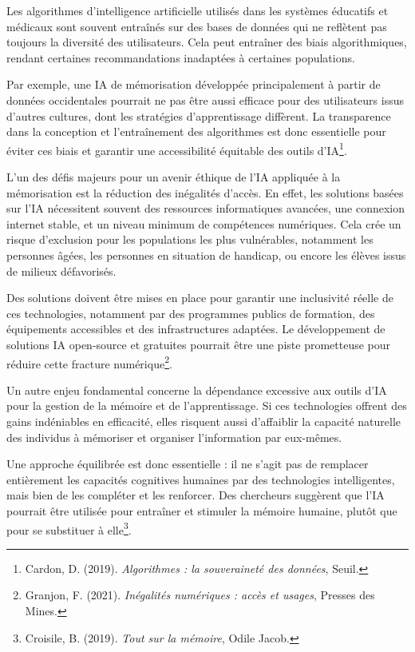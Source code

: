 \documentclass[12pt,a4paper]{report}
\begin{document}
Les algorithmes d’intelligence artificielle utilisés dans les systèmes éducatifs et médicaux sont souvent entraînés sur des bases de données qui ne reflètent pas toujours la diversité des utilisateurs. Cela peut entraîner des biais algorithmiques, rendant certaines recommandations inadaptées à certaines populations.

Par exemple, une IA de mémorisation développée principalement à partir de données occidentales pourrait ne pas être aussi efficace pour des utilisateurs issus d’autres cultures, dont les stratégies d’apprentissage diffèrent. La transparence dans la conception et l’entraînement des algorithmes est donc essentielle pour éviter ces biais et garantir une accessibilité équitable des outils d’IA\footnote{Cardon, D. (2019). \textit{Algorithmes : la souveraineté des données}, Seuil.}.

L’un des défis majeurs pour un avenir éthique de l’IA appliquée à la mémorisation est la réduction des inégalités d’accès. En effet, les solutions basées sur l’IA nécessitent souvent des ressources informatiques avancées, une connexion internet stable, et un niveau minimum de compétences numériques. Cela crée un risque d’exclusion pour les populations les plus vulnérables, notamment les personnes âgées, les personnes en situation de handicap, ou encore les élèves issus de milieux défavorisés.

Des solutions doivent être mises en place pour garantir une inclusivité réelle de ces technologies, notamment par des programmes publics de formation, des équipements accessibles et des infrastructures adaptées. Le développement de solutions IA open-source et gratuites pourrait être une piste prometteuse pour réduire cette fracture numérique\footnote{Granjon, F. (2021). \textit{Inégalités numériques : accès et usages}, Presses des Mines.}.

Un autre enjeu fondamental concerne la dépendance excessive aux outils d’IA pour la gestion de la mémoire et de l’apprentissage. Si ces technologies offrent des gains indéniables en efficacité, elles risquent aussi d’affaiblir la capacité naturelle des individus à mémoriser et organiser l’information par eux-mêmes.

Une approche équilibrée est donc essentielle : il ne s’agit pas de remplacer entièrement les capacités cognitives humaines par des technologies intelligentes, mais bien de les compléter et les renforcer. Des chercheurs suggèrent que l’IA pourrait être utilisée pour entraîner et stimuler la mémoire humaine, plutôt que pour se substituer à elle\footnote{Croisile, B. (2019). \textit{Tout sur la mémoire}, Odile Jacob.}.
\end{document}
